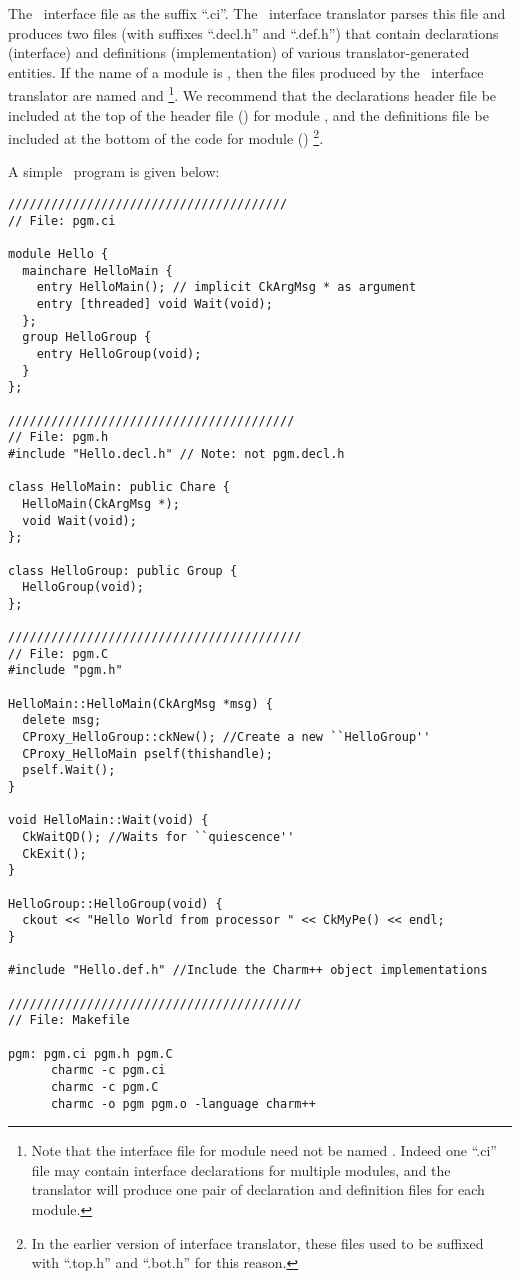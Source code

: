 The \charmpp\ interface file as the suffix ``.ci''. 
The \charmpp\ interface translator parses this file and produces two files 
(with suffixes ``.decl.h'' and ``.def.h'') that contain declarations 
(interface) and definitions (implementation)
of various translator-generated entities. If the name of a
module is , then the files produced by the \charmpp\ interface translator 
are named  and \footnote{Note that the interface 
file for module  need not be named . Indeed one ``.ci'' 
file may contain interface declarations for multiple modules, and the 
translator will produce one pair of declaration and definition files for each 
module.}.  We recommend that the declarations header file be included at the 
top of the header file () for module , and the definitions 
file be included at the bottom of the code for module ()
\footnote{In the earlier version of interface translator, these files used to 
be suffixed with ``.top.h'' and ``.bot.h'' for this reason.}.

A simple \charmpp\ program is given below:

\begin{verbatim}
///////////////////////////////////////
// File: pgm.ci

module Hello {
  mainchare HelloMain {
    entry HelloMain(); // implicit CkArgMsg * as argument
    entry [threaded] void Wait(void);
  };
  group HelloGroup {
    entry HelloGroup(void);
  } 
};

////////////////////////////////////////
// File: pgm.h
#include "Hello.decl.h" // Note: not pgm.decl.h

class HelloMain: public Chare {
  HelloMain(CkArgMsg *);
  void Wait(void);
};

class HelloGroup: public Group {
  HelloGroup(void);
};

/////////////////////////////////////////
// File: pgm.C
#include "pgm.h"

HelloMain::HelloMain(CkArgMsg *msg) {
  delete msg;
  CProxy_HelloGroup::ckNew(); //Create a new ``HelloGroup''
  CProxy_HelloMain pself(thishandle);
  pself.Wait();
}

void HelloMain::Wait(void) {
  CkWaitQD(); //Waits for ``quiescence''
  CkExit();
}

HelloGroup::HelloGroup(void) {
  ckout << "Hello World from processor " << CkMyPe() << endl;
}

#include "Hello.def.h" //Include the Charm++ object implementations

/////////////////////////////////////////
// File: Makefile

pgm: pgm.ci pgm.h pgm.C
      charmc -c pgm.ci
      charmc -c pgm.C
      charmc -o pgm pgm.o -language charm++

\end{verbatim}

